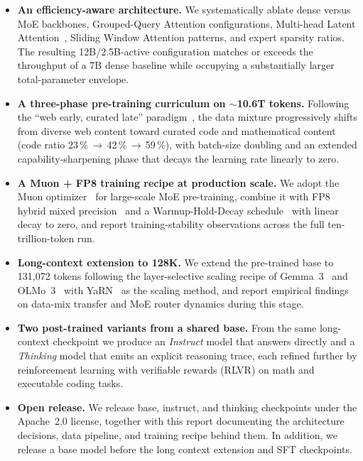 \documentclass{llmxive}
\begin{document}
\begin{itemize}
  \item \textbf{An efficiency-aware architecture.} We systematically ablate
    dense versus MoE backbones, Grouped-Query Attention configurations,
    Multi-head Latent Attention~\cite{deepseekai2024deepseekv2}, Sliding
    Window Attention patterns, and expert sparsity ratios. The resulting 12B/2.5B-active configuration matches or exceeds the throughput of a 7B dense baseline while occupying a substantially larger total-parameter envelope.
  \item \textbf{A three-phase pre-training curriculum on ${\sim}$10.6T tokens.}
    Following the ``web early, curated late''
    paradigm~\cite{grattafiori2024llama3}, the data mixture progressively
    shifts from diverse web content toward curated code and mathematical
    content (code ratio 23\,\%\,$\to$\,42\,\%\,$\to$\,59\,\%), with batch-size
    doubling and an extended capability-sharpening phase that decays the
    learning rate linearly to zero.
  \item \textbf{A Muon + FP8 training recipe at production scale.} We adopt
    the Muon optimizer~\cite{jordan2024muon,liu2025muon} for large-scale MoE
    pre-training, combine it with FP8 hybrid mixed
    precision~\cite{micikevicius2022fp8} and a Warmup-Hold-Decay
    schedule~\cite{hu2024minicpm,hagele2024scaling} with linear decay to
    zero, and report training-stability observations across the full
    ten-trillion-token run.
  \item \textbf{Long-context extension to 128K.} We extend the pre-trained
    base to 131{,}072 tokens following the layer-selective scaling recipe
    of Gemma~3~\cite{team2025gemma3} and OLMo~3~\cite{olmo3} with
    YaRN~\cite{peng2024yarn} as the scaling method, and report empirical
    findings on data-mix transfer and MoE router dynamics during this
    stage.
  \item \textbf{Two post-trained variants from a shared base.} From the same
    long-context checkpoint we produce an \emph{Instruct} model that answers
    directly and a \emph{Thinking} model that emits an explicit reasoning
    trace, each refined further by reinforcement learning with verifiable
    rewards (RLVR) on math and executable coding tasks.
  \item \textbf{Open release.} We release base, instruct, and thinking
    checkpoints under the Apache~2.0 license, together with this report
    documenting the architecture decisions, data pipeline, and training
    recipe behind them. In addition, we release a base model before the long context extension and SFT checkpoints.
\end{itemize}
\end{document}

